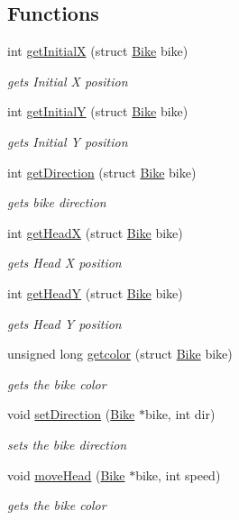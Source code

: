 \subsection*{Functions}
\begin{DoxyCompactItemize}
\item 
int \hyperlink{group__Bike_ga9d5bd9dd5a4b9347fa04fb0a47e7b138}{get\+InitialX} (struct \hyperlink{structBike}{Bike} bike)
\begin{DoxyCompactList}\small\item\em gets Initial X position \end{DoxyCompactList}\item 
int \hyperlink{group__Bike_ga2d556c34524f8fe950a96aa665aaffe8}{get\+InitialY} (struct \hyperlink{structBike}{Bike} bike)
\begin{DoxyCompactList}\small\item\em gets Initial Y position \end{DoxyCompactList}\item 
int \hyperlink{group__Bike_ga8d48f7de63dc2a17f3eac8b3e96f9b12}{get\+Direction} (struct \hyperlink{structBike}{Bike} bike)
\begin{DoxyCompactList}\small\item\em gets bike direction \end{DoxyCompactList}\item 
int \hyperlink{group__Bike_gaf4691615a2b7398e9c3b4ae2f93553e0}{get\+HeadX} (struct \hyperlink{structBike}{Bike} bike)
\begin{DoxyCompactList}\small\item\em gets Head X position \end{DoxyCompactList}\item 
int \hyperlink{group__Bike_gaafe273e5e247e3efd463e232686328d6}{get\+HeadY} (struct \hyperlink{structBike}{Bike} bike)
\begin{DoxyCompactList}\small\item\em gets Head Y position \end{DoxyCompactList}\item 
unsigned long \hyperlink{group__Bike_ga04fad9ee3b40712d1fde03fc5441ea73}{getcolor} (struct \hyperlink{structBike}{Bike} bike)
\begin{DoxyCompactList}\small\item\em gets the bike color \end{DoxyCompactList}\item 
void \hyperlink{group__Bike_ga0310311d1c88668900502c150b52120b}{set\+Direction} (\hyperlink{structBike}{Bike} $\ast$bike, int dir)
\begin{DoxyCompactList}\small\item\em sets the bike direction \end{DoxyCompactList}\item 
void \hyperlink{group__Bike_gadd2170ef6cbb83a919f06cf9c971c9a5}{move\+Head} (\hyperlink{structBike}{Bike} $\ast$bike, int speed)
\begin{DoxyCompactList}\small\item\em gets the bike color \end{DoxyCompactList}\end{DoxyCompactItemize}
